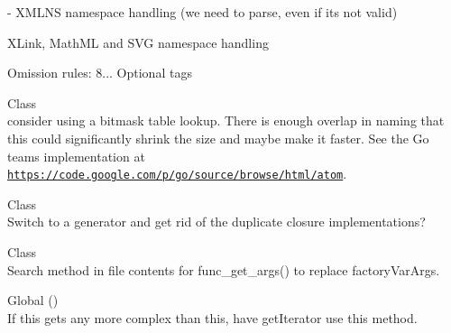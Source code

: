 \begin{DoxyRefList}
\label{todo__todo000018}%
%
-\/ XMLNS namespace handling (we need to parse, even if it\textquotesingle{}s not valid)
\begin{DoxyItemize}
\item XLink, Math\+ML and SVG namespace handling
\item Omission rules\+: 8... Optional tags
\end{DoxyItemize}
\item[Class \doxylink{class_masterminds_1_1_h_t_m_l5_1_1_elements}{Elements} ]\hfill \\
\label{todo__todo000017}%
%
consider using a bitmask table lookup. There is enough overlap in naming that this could significantly shrink the size and maybe make it faster. See the Go teams implementation at \href{https://code.google.com/p/go/source/browse/html/atom}{\texttt{https\+://code.\+google.\+com/p/go/source/browse/html/atom}}.  
\item[Class \doxylink{class_psy_1_1_execution_loop_closure}{Execution\+Loop\+Closure} ]\hfill \\
\label{todo__todo000028}%
%
Switch  to a generator and get rid of the duplicate closure implementations?  
\item[Class \doxylink{class_factory_method}{Factory\+Method} ]\hfill \\
\label{todo__todo000012}%
%
Search method in file contents for func\+\_\+get\+\_\+args() to replace factory\+Var\+Args.  
\item[Global \doxylink{class_whoops_1_1_exception_1_1_frame_collection_a3f86c2f58955e5100b8411ab13927232}{Frame\+Collection\+::get\+Array} ()]\hfill \\
\label{todo__todo000009}%
%
If this gets any more complex than this, have get\+Iterator use this method.  
\item[Global \doxylink{class_p_h_p_unit_1_1_framework_1_1_mock_object_1_1_generator_1_1_generator_a1cfbf556c77c19f3b48879ba3dd8386d}{Generator\+::generate} (string \$type, bool \$mock\+Object, bool \$mark\+As\+Mock\+Object, ?array \$methods=null, string \$mock\+Class\+Name=\textquotesingle{}\textquotesingle{}, bool \$call\+Original\+Clone=true, bool \$call\+Autoload=true, bool \$clone\+Arguments=true, bool \$call\+Original\+Methods=false)]\hfill \\
\label{todo__todo000024}%
%

\end{DoxyRefList}
